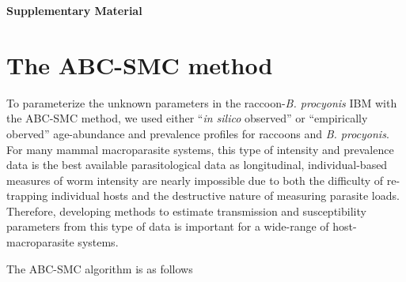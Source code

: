 \documentclass[a4paper]{article}
\begin{document}
\doublespacing
\linenumbers

\noindent
{\Large\textbf{Supplementary Material}}

\section{The ABC-SMC method}

To parameterize the unknown parameters in the
raccoon-\emph{B. procyonis} IBM with the ABC-SMC method, we used either ``\emph{in silico} observed'' or ``empirically oberved'' age-abundance and
prevalence profiles for raccoons and \emph{B. procyonis}. For many mammal macroparasite
systems, this type of intensity and prevalence data is the best
available parasitological data as longitudinal, individual-based
measures of worm intensity are nearly impossible due to both the
difficulty of re-trapping individual hosts and the destructive nature of
measuring parasite loads.
Therefore, developing methods to estimate transmission and
susceptibility parameters from this type of data is important for a
wide-range of host-macroparasite systems.

The ABC-SMC algorithm is as follows \citep{Toni2009,Sisson2009,Beaumont2010}
\end{document}
